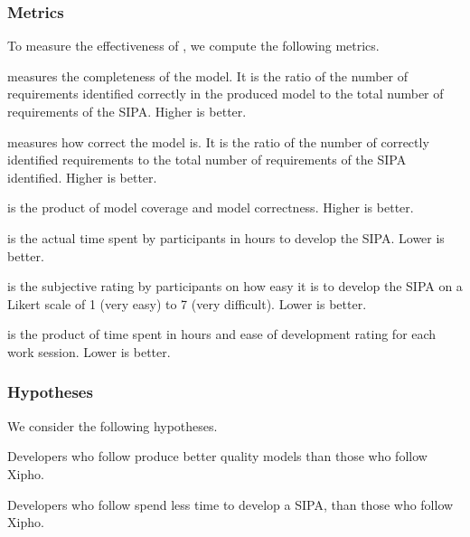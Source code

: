 \subsubsection*{Metrics}

To measure the effectiveness of \frameworkA, we compute the following metrics.

\begin{description}[leftmargin=1em]
\item[Model coverage] measures the completeness of the model. It is the
ratio of the number of requirements identified correctly in the produced
model to the total number of requirements of the SIPA. Higher is better.

\item[Model correctness] measures how correct the model is.  It is the
ratio of the number of correctly identified requirements to the total
number of requirements of the SIPA identified.  Higher is better.

\item[Model quality] is the product of model coverage and model
correctness. Higher is better.

\item[Time to develop] is the actual time spent by participants in hours
to develop the SIPA.  Lower is better.

\item[Difficulty of development] is the subjective rating by
participants on how easy it is to develop the SIPA on a Likert scale of
1 (very easy) to 7 (very difficult). Lower is better.

\item[Effort to develop] is the product of time spent in hours and ease
of development rating for each work session. Lower is better.
\end{description}

\subsubsection*{Hypotheses}

We consider the following hypotheses.

\bhypothesis

\item Developers who follow \frameworkA produce better quality models 
than those who follow Xipho.  

\item Developers who follow \frameworkA spend less time to develop 
a SIPA, than those who follow Xipho.

